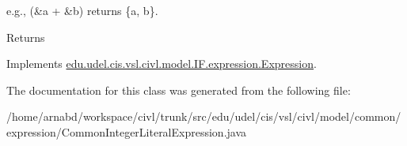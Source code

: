 e.\+g., {\ttfamily (\&a + \&b)} returns {\ttfamily \{a, b\}}.

\begin{DoxyReturn}{Returns}

\end{DoxyReturn}


Implements \hyperlink{interfaceedu_1_1udel_1_1cis_1_1vsl_1_1civl_1_1model_1_1IF_1_1expression_1_1Expression_ac2ad0236534bec54b91ee78ff658cbe0}{edu.\+udel.\+cis.\+vsl.\+civl.\+model.\+I\+F.\+expression.\+Expression}.



The documentation for this class was generated from the following file\+:\begin{DoxyCompactItemize}
\item 
/home/arnabd/workspace/civl/trunk/src/edu/udel/cis/vsl/civl/model/common/expression/Common\+Integer\+Literal\+Expression.\+java\end{DoxyCompactItemize}
